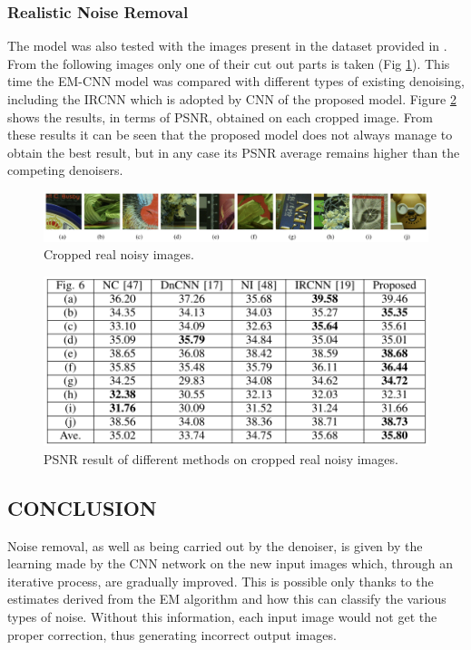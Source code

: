 \subsubsection{Realistic Noise Removal}
The model was also tested with the images present in the dataset provided 
in \cite{0884882845}. From the following images only one of their cut out parts is taken 
(Fig \ref{fig:crop}). This time the EM-CNN model was compared with different types 
of existing denoising, including the IRCNN which is adopted by CNN of the 
proposed model. Figure \ref{fig:cropRes} shows the results, in terms of PSNR, obtained on 
each cropped image. From these results it can be seen that the proposed 
model does not always manage to obtain the best result, but in any case its 
PSNR average remains higher than the competing denoisers.
\begin{figure}[h!]
    \centering
    \includegraphics[width = \linewidth]{images/paper7/crop.png}
    \centering
    \caption{Cropped real noisy images.}
    \label{fig:crop}
\end{figure}

\begin{figure}[h!]
    \centering
    \includegraphics[width = 0.7\linewidth]{images/paper7/crop result.png}
    \centering
    \caption{PSNR result of different methods on cropped real noisy images.}
    \label{fig:cropRes}
\end{figure}

\subsection{CONCLUSION}
Noise removal, as well as being carried out by the denoiser, is given by the 
learning made by the CNN network on the new input images which, through 
an iterative process, are gradually improved. This is possible only thanks to 
the estimates derived from the EM algorithm and how this can classify the 
various types of noise. Without this information, each input image would 
not get the proper correction, thus generating incorrect output images.